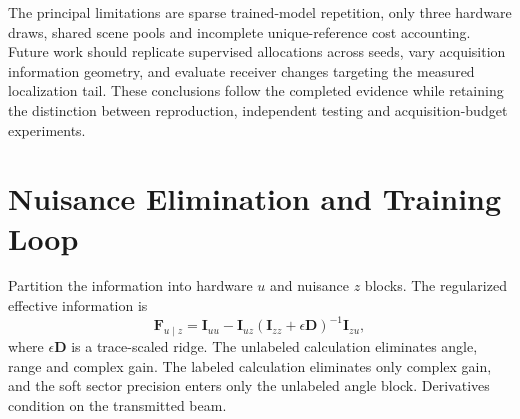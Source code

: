 \documentclass[conference]{IEEEtran}
\newcommand{\F}{\mathbf{F}}
\begin{document}
The principal limitations are sparse trained-model repetition, only three hardware draws, shared scene pools and incomplete unique-reference cost accounting. Future work should replicate supervised allocations across seeds, vary acquisition information geometry, and evaluate receiver changes targeting the measured localization tail. These conclusions follow the completed evidence while retaining the distinction between reproduction, independent testing and acquisition-budget experiments.
\appendices
\section{Nuisance Elimination and Training Loop}
Partition the information into hardware $u$ and nuisance $z$ blocks. The regularized effective information is
\begin{equation}
 \F_{u\mid z}=\mathbf I_{uu}-\mathbf I_{uz}(\mathbf I_{zz}+\epsilon\mathbf D)^{-1}\mathbf I_{zu},
\end{equation}
where $\epsilon\mathbf D$ is a trace-scaled ridge. The unlabeled calculation eliminates angle, range and complex gain. The labeled calculation eliminates only complex gain, and the soft sector precision enters only the unlabeled angle block. Derivatives condition on the transmitted beam.
\end{document}
